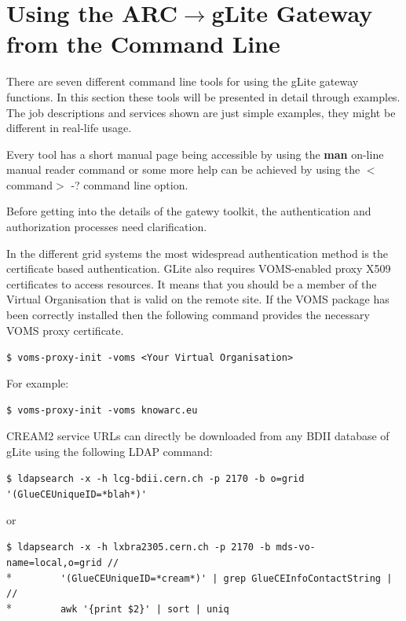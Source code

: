 \documentclass{article}
\begin{document}
\section{Using the ARC${\rightarrow}$gLite Gateway from the Command Line}
\label{Users guide}
There are seven different command line tools for using the gLite gateway functions. In this section these tools will be presented in detail through examples. The job descriptions and services shown are just simple examples, they might be different in real-life usage.\par
Every tool has a short manual page being accessible by using the \textbf{man} on-line manual reader command or some more help can be achieved by using the $<$command$>$ -? command line option.\par
Before getting into the details of the gatewy toolkit, the authentication and authorization processes need clarification.\par
In the different grid systems the most widespread authentication method is the certificate based authentication. GLite also requires VOMS-enabled proxy X509 certificates to access resources. It means that you should be a member of the Virtual Organisation that is valid on the remote site. If the VOMS package has been correctly installed then the following command provides the necessary VOMS proxy certificate.\par
\begin{shaded}\verb#$ voms-proxy-init -voms <Your Virtual Organisation>#\end{shaded}
For example:
\begin{shaded}\verb#$ voms-proxy-init -voms knowarc.eu#\end{shaded}
CREAM2 service URLs can directly be downloaded from any BDII database of gLite using the following LDAP command:
\begin{shaded}
\verb#$ ldapsearch -x -h lcg-bdii.cern.ch -p 2170 -b o=grid '(GlueCEUniqueID=*blah*)'#
\end{shaded}
or
\begin{shaded}
\verb#$ ldapsearch -x -h lxbra2305.cern.ch -p 2170 -b mds-vo-name=local,o=grid //#\\*
\verb#        '(GlueCEUniqueID=*cream*)' | grep GlueCEInfoContactString | //#\\*
\verb#        awk '{print $2}' | sort | uniq#
\end{shaded}
\end{document}
